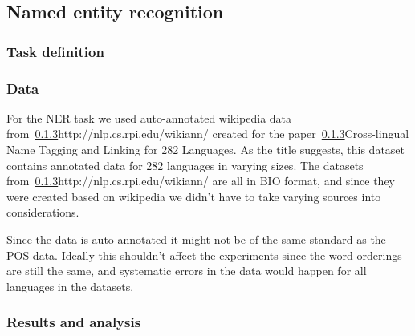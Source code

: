 

\subsection{Named entity recognition}


\subsubsection{Task definition}


\subsubsection{Data}

For the NER task we used auto-annotated wikipedia data
from~\ref{}{http://nlp.cs.rpi.edu/wikiann/} created for the
paper~\ref{}{Cross-lingual Name Tagging and Linking for 282 Languages}. As the
title suggests, this dataset contains annotated data for 282 languages in
varying sizes. The datasets from~\ref{}{http://nlp.cs.rpi.edu/wikiann/} are all
in BIO format, and since they were created based on wikipedia we didn't have to
take varying sources into considerations.

Since the data is auto-annotated it might not be of the same standard as the POS
data. Ideally this shouldn't affect the experiments since the word orderings are
still the same, and systematic errors in the data would happen for all languages
in the datasets.

\subsubsection{Results and analysis}


\pagebreak
